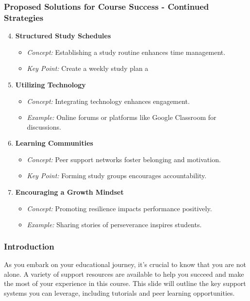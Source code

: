 \documentclass[aspectratio=169]{beamer}
\begin{document}
\begin{frame}[fragile]
    \frametitle{Proposed Solutions for Course Success - Continued Strategies}
    \begin{enumerate}
        \setcounter{enumi}{3}  %
        \item \textbf{Structured Study Schedules}
            \begin{itemize}
                \item \textit{Concept:} Establishing a study routine enhances time management.
                \item \textit{Key Point:} Create a weekly study plan a
            \end{itemize}
        
        \item \textbf{Utilizing Technology}
            \begin{itemize}
                \item \textit{Concept:} Integrating technology enhances engagement.
                \item \textit{Example:} Online forums or platforms like Google Classroom for discussions.
            \end{itemize}
        
        \item \textbf{Learning Communities}
            \begin{itemize}
                \item \textit{Concept:} Peer support networks foster belonging and motivation.
                \item \textit{Key Point:} Forming study groups encourages accountability.
            \end{itemize}
        
        \item \textbf{Encouraging a Growth Mindset}
            \begin{itemize}
                \item \textit{Concept:} Promoting resilience impacts performance positively.
                \item \textit{Example:} Sharing stories of perseverance inspires students.
            \end{itemize}
    \end{enumerate}
\end{frame}

\begin{frame}[fragile]
    \frametitle{Introduction}
    As you embark on your educational journey, it's crucial to know that you are not alone. A variety of support resources are available to help you succeed and make the most of your experience in this course. This slide will outline the key support systems you can leverage, including tutorials and peer learning opportunities.
\end{frame}
\end{document}
